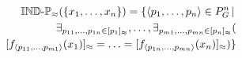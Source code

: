 \documentclass[a4paper]{article}
\begin{document}
\small
\begin{definition}
\label{def:generalized_indiscernibility_criteria}
\begin{align}
  \indp_{\approx}(\set{\range{x_1}{x_n}})
=
  \setdef{
    \tuplerange{p_1}{p_n} \in P_G^n
  }{\\
      \exists_{\range{p_{11}}{p_{1n}} \in \equivset{p_1}},
    \ldots,
      \exists_{\range{p_{m1}}{p_{mn}} \in \equivset{p_n}}
    (\nonumber\\
        \equivset{f_{\tuplerange{p_{11}}{p_{m1}}} (x_1)}
      =
        \ldots
      =
        \equivset{f_{\tuplerange{p_{1n}}{p_{mn}}} (x_n)}
    )
  }\nonumber
\end{align}
\end{definition}
\normalsize
\end{document}
